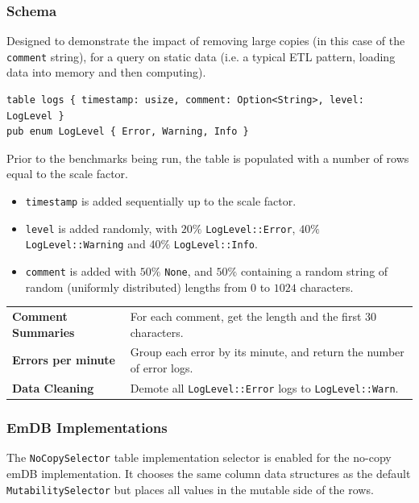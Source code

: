 \subsubsection{Schema}
Designed to demonstrate the impact of removing large copies (in this case of the \texttt{comment} string), for a query on static data (i.e. a typical ETL pattern, loading data into memory and then computing).
\begin{verbatim}
table logs { timestamp: usize, comment: Option<String>, level: LogLevel }
pub enum LogLevel { Error, Warning, Info }
\end{verbatim}
Prior to the benchmarks being run, the table is populated with a number of rows equal to the scale factor.
\begin{itemize}
    \setlength\itemsep{0em}
    \item \texttt{timestamp} is added sequentially up to the scale factor.
    \item \texttt{level} is added randomly, with $20\%$ \texttt{LogLevel::Error}, $40\%$ \texttt{LogLevel::Warning} and $40\%$ \texttt{LogLevel::Info}.
    \item \texttt{comment} is added with $50\%$ \texttt{None}, and $50\%$ containing a random string of random (uniformly distributed) lengths from $0$ to $1024$ characters.
\end{itemize}
\noindent
\begin{tabular}{l p{}}
    \textbf{Comment Summaries} & For each comment, get the length and the first 30 characters.                            \\
    \textbf{Errors per minute} & Group each error by its minute, and return the number of error logs.                     \\
    \textbf{Data Cleaning}     & Demote all \texttt{LogLevel::Error} logs to \texttt{LogLevel::Warn}. \\
\end{tabular}

\subsubsection{EmDB Implementations}
The \texttt{NoCopySelector} table implementation selector is enabled for the no-copy emDB
implementation. It chooses the same column data structures as the default \texttt{MutabilitySelector}
but places all values in the mutable side of the rows.
